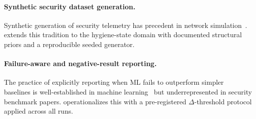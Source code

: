 \paragraph{Synthetic security dataset generation.}
Synthetic generation of security telemetry has precedent in network
simulation~\cite{creech2013kdd}. \hygienebench extends this tradition to the
hygiene-state domain with documented structural priors and a reproducible seeded
generator.

\paragraph{Failure-aware and negative-result reporting.}
The practice of explicitly reporting when ML fails to outperform simpler baselines
is well-established in machine learning~\cite{sculley2018winners} but
underrepresented in security benchmark papers. \hygienebench operationalizes this
with a pre-registered $\Delta$-threshold protocol applied across all runs.
